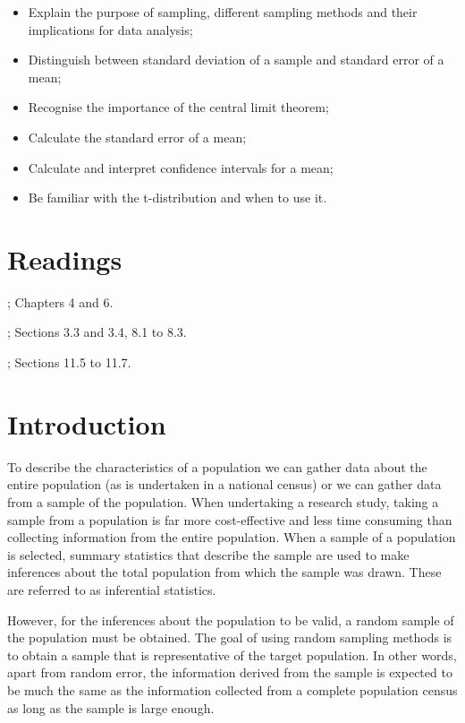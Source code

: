 \documentclass[
]{memoir}
\providecommand{\tightlist}{%
  \setlength{\itemsep}{0pt}\setlength{\parskip}{0pt}}
\begin{document}
\begin{itemize}
\tightlist
\item
  Explain the purpose of sampling, different sampling methods and their implications for data analysis;
\item
  Distinguish between standard deviation of a sample and standard error of a mean;
\item
  Recognise the importance of the central limit theorem;
\item
  Calculate the standard error of a mean;
\item
  Calculate and interpret confidence intervals for a mean;
\item
  Be familiar with the t-distribution and when to use it.
\end{itemize}

\hypertarget{readings-2}{%
\section*{Readings}\label{readings-2}}

\citet{kirkwood_sterne01a}; Chapters 4 and 6.

\citet{bland15b}; Sections 3.3 and 3.4, 8.1 to 8.3.

\citet{juul_frydenberg14}; Sections 11.5 to 11.7.

\hypertarget{introduction-1}{%
\section{Introduction}\label{introduction-1}}

To describe the characteristics of a population we can gather data about the entire population (as is undertaken in a national census) or we can gather data from a sample of the population. When undertaking a research study, taking a sample from a population is far more cost-effective and less time consuming than collecting information from the entire population. When a sample of a population is selected, summary statistics that describe the sample are used to make inferences about the total population from which the sample was drawn. These are referred to as inferential statistics.

However, for the inferences about the population to be valid, a random sample of the population must be obtained. The goal of using random sampling methods is to obtain a sample that is representative of the target population. In other words, apart from random error, the information derived from the sample is expected to be much the same as the information collected from a complete population census as long as the sample is large enough.
\end{document}
